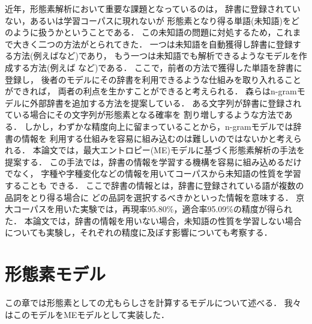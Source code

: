 近年，形態素解析において重要な課題となっているのは，
辞書に登録されていない，あるいは学習コーパスに現れないが
形態素となり得る単語(未知語)をどのように扱うかということである．
この未知語の問題に対処するため，これまで大きく二つの方法がとられてきた．
一つは未知語を自動獲得し辞書に登録する方法(例えば\cite{Mori:96}など)であり，
もう一つは未知語でも解析できるようなモデルを作成する方法(例えば
\cite{Kashioka:97,Nagata:99}など)である．
ここで，前者の方法で獲得した単語を辞書に登録し，
後者のモデルにその辞書を利用できるような仕組みを取り入れることができれば，
両者の利点を生かすことができると考えられる．
森らはn-gramモデルに外部辞書を追加する方法を提案している\cite{Mori:98}．
ある文字列が辞書に登録されている場合にその文字列が形態素となる確率を
割り増しするような方法である．
しかし，わずかな精度向上に留まっていることから，n-gramモデルでは辞書の情報を
利用する仕組みを容易に組み込むのは難しいのではないかと考えられる．
本論文では，最大エントロピー(ME)モデルに基づく形態素解析の手法を提案する．
この手法では，辞書の情報を学習する機構を容易に組み込めるだけでなく，
字種や字種変化などの情報を用いてコーパスから未知語の性質を学習することも
できる．
ここで辞書の情報とは，辞書に登録されている語が複数の品詞をとり得る場合に
どの品詞を選択するべきかといった情報を意味する．
京大コーパスを用いた実験では，再現率95.80\%，適合率95.09\%の精度が得られた．
本論文では，辞書の情報を用いない場合，未知語の性質を学習しない場合
についても実験し，それぞれの精度に及ぼす影響についても考察する．

\section{形態素モデル}
\label{sec:model}

この章では形態素としての尤もらしさを計算するモデルについて述べる．
我々はこのモデルをMEモデルとして実装した．


